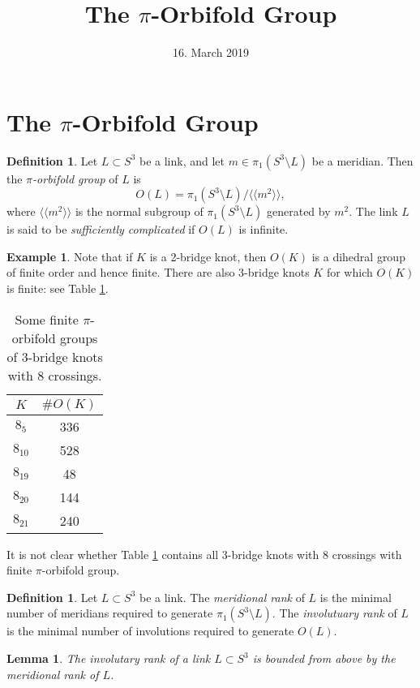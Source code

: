 \documentclass[11pt]{article}
\title{The $\pi$-Orbifold Group}
\date{16. March 2019}
\newtheorem{lemma}[theorem]{Lemma}
\theoremstyle{definition}
\newtheorem{definition}[theorem]{Definition}
\newtheorem{example}[theorem]{Example}
\begin{document}
\section{The $\pi$-Orbifold Group}
\begin{definition}
Let $L \subset S^3$ be a link, and let $m \in \pi_1(S^3 \setminus L)$ be a meridian. Then the \textit{$\pi$-orbifold group} of $L$ is
$$O(L) = \pi_1(S^3 \setminus L)/\langle\langle m^2 \rangle \rangle,$$
where $\langle \langle m^2 \rangle \rangle$ is the normal subgroup of $\pi_1(S^3 \setminus L)$ generated by $m^2$. The link $L$ is said to be \textit{sufficiently complicated} if $O(L)$ is infinite.
\end{definition}

\begin{example}
Note that if $K$ is a 2-bridge knot, then $O(K)$ is a dihedral group of finite order and hence finite. There are also 3-bridge knots $K$ for which $O(K)$ is finite: see Table \ref{tab:finite_3-bridge_orbifold_groups}.

\begin{table}[ht]
\centering
\begin{tabular}{c|c}
{$K$} & {$\#O(K)$} \\
\hline
$8_{5}$ & 336 \\
$8_{10}$ & 528 \\
$8_{19}$ & 48 \\
$8_{20}$ & 144 \\$8_{21}$ & 240

\end{tabular}
\caption{Some finite $\pi$-orbifold groups \\ 
of 3-bridge knots with 8 crossings.}
\label{tab:finite_3-bridge_orbifold_groups}
\end{table}
It is not clear whether Table \ref{tab:finite_3-bridge_orbifold_groups} contains all 3-bridge knots with 8 crossings with finite $\pi$-orbifold group.
\end{example}

\begin{definition}
Let $L\subset S^3$ be a link. The \textit{meridional rank} of $L$ is the minimal number of meridians required to generate $\pi_1(S^3 \setminus L)$. The \textit{involutuary rank} of $L$ is the minimal number of involutions required to generate $O(L)$.
\end{definition}

\begin{lemma}\label{lemma:inv_less_mer}
The involutary rank of a link $L \subset S^3$ is bounded from above by the meridional rank of $L$.
\end{lemma}
\end{document}
